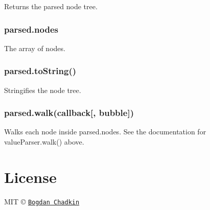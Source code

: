 {\ttfamily }

{\ttfamily Returns the parsed node tree.}

{\ttfamily \subsubsection*{parsed.\+nodes}}

{\ttfamily }

{\ttfamily The array of nodes.}

{\ttfamily \subsubsection*{parsed.\+to\+String()}}

{\ttfamily }

{\ttfamily Stringifies the node tree.}

{\ttfamily \subsubsection*{parsed.\+walk(callback\mbox{[}, bubble\mbox{]})}}

{\ttfamily }

{\ttfamily Walks each node inside {\ttfamily parsed.\+nodes}. See the documentation for {\ttfamily value\+Parser.\+walk()} above.}

{\ttfamily \section*{License}}

{\ttfamily }

{\ttfamily M\+IT © \href{mailto:trysound@yandex.ru}{\tt Bogdan Chadkin} }